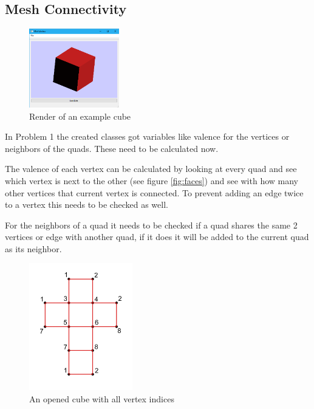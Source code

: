 \documentclass[11.5pt,oneside,a4paper]{scrartcl}
\newcounter{ct}
\begin{document}
\subsection{Mesh Connectivity}

\begin{figure}
	\centering
	\includegraphics[width=0.35\textwidth]{renderedcube.png}
	\caption{Render of an example cube}
	\label{fig:renderedcube}
\end{figure}

In Problem 1 the created classes got variables like valence for the vertices or neighbors of the quads. These need to be calculated now.


The valence of each vertex can be calculated by looking at every quad and see which vertex is next to the other (see figure \ref{fig:faces}) and see with how many other vertices that current vertex is connected. To prevent adding an edge twice to a vertex this needs to be checked as well.

For the neighbors of a quad it needs to be checked if a quad shares the same 2 vertices or edge with another quad, if it does it will be added to the current quad as its neighbor.

\begin{figure}
	\centering
	\includegraphics[width=0.4\textwidth]{cube.png}
	\caption{An opened cube with all vertex indices}
	\label{fig:cube}
\end{figure}
\end{document}

